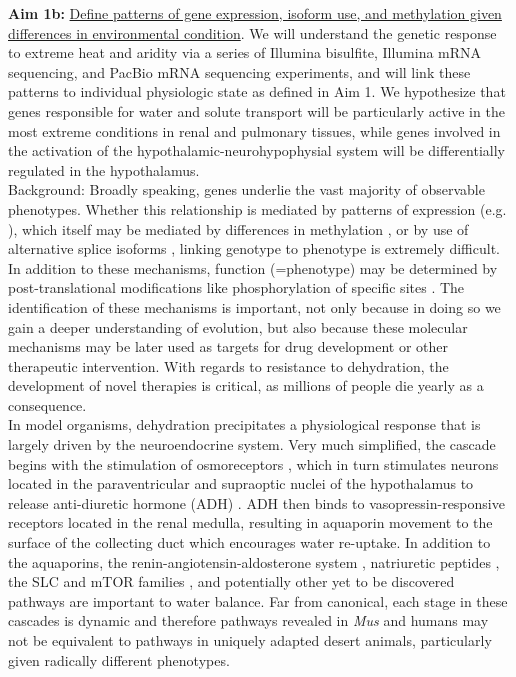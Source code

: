 \documentclass[11pt]{article}
\begin{document}
\noindent \textbf{Aim 1b:} \ul{Define patterns of gene expression, isoform use, and methylation given differences in environmental condition}. {We will understand the genetic response to extreme heat and aridity via a series of Illumina bisulfite, Illumina mRNA sequencing, and PacBio mRNA sequencing experiments, and will link these patterns to individual physiologic state as defined in Aim 1.} We hypothesize that genes responsible for water and solute transport will be particularly active in the most extreme conditions in renal and pulmonary tissues, while genes involved in the activation of the hypothalamic-neurohypophysial system will be differentially regulated in the hypothalamus.\\

Background: Broadly speaking, genes underlie the vast majority of observable phenotypes. Whether this relationship is mediated by patterns of expression (e.g. \cite{Teets:2012gt}), which itself may be mediated by differences in methylation \citep{Brenet:2011dq}, or by use of alternative splice isoforms \citep{Yukutake:2010ia}, linking genotype to phenotype is extremely difficult. In addition to these mechanisms, function (=phenotype) may be determined by post-translational modifications like phosphorylation of specific sites \citep{Anonymous:2009gb}. The identification of these mechanisms is important, not only because in doing so we gain a deeper understanding of evolution, but also because these molecular mechanisms may be later used as targets for drug development or other therapeutic intervention. With regards to resistance to dehydration, the development of novel therapies is critical, as millions of people die yearly as a consequence. \\

In model organisms, dehydration precipitates a physiological response that is largely driven by the neuroendocrine system. Very much simplified, the cascade begins with the stimulation of osmoreceptors \citep{Arsenijevic:1985bi}, which in turn stimulates neurons located in the paraventricular and supraoptic nuclei of the hypothalamus to release anti-diuretic hormone (ADH) \citep{Zingg:1986vb}. ADH then binds to vasopressin-responsive receptors located in the renal medulla, resulting in aquaporin movement to the surface of the collecting duct \citep{Nielsen:1995uq} which encourages water re-uptake. In addition to the aquaporins, the renin-angiotensin-aldosterone system \citep{Gubler:2010bh}, natriuretic peptides \citep{Totsune:1994kf}, the SLC and mTOR families \citep{Ortells:2012go}, and potentially other yet to be discovered pathways are important to water balance. Far from canonical, each stage in these cascades is dynamic and therefore pathways revealed in \textit{Mus} and humans may not be equivalent to pathways in uniquely adapted desert animals, particularly given radically different phenotypes.\\
\end{document}
